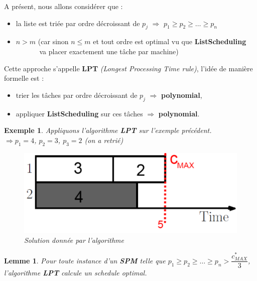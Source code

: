 \documentclass[12pt]{article}
\newcommand{\titre}[1]{\textcolor{title}{#1}}
\newtheorem{exemple}{Exemple}[section]
\newtheorem{lemme}{Lemme}[section]
\begin{document}
\noindent A présent, nous allons considérer que :
\begin{itemize}
\item la liste est triée par ordre décroissant de $p_j$ $\Longrightarrow$ $p_1\geq p_2 \geq \ldots \geq p_n$
\item $n > m$ (car sinon $n\leq m$ et tout ordre est optimal vu que \textbf{ListScheduling} \\\indent $\qquad\quad$ va placer exactement
une tâche par machine) \\
\end{itemize}

Cette approche s'appelle \textbf{LPT} \textit{(Longest Processing Time rule)}, l'idée de manière formelle est :
\begin{itemize}
\item trier les tâches par ordre décroissant de $p_j$ $\Longrightarrow$ \textbf{polynomial},
\item appliquer \textbf{ListScheduling} sur ces tâches $\Longrightarrow$ \textbf{polynomial}.
\end{itemize}

\begin{exemple} Appliquons l'algorithme \textbf{LPT} sur l'exemple précédent.\\
$\Rightarrow p_1 = 4$, $p_2 = 3$, $p_3 = 2$ (on a retrié)
\begin{figure}[h!]
    \begin{center}
    \includegraphics[scale=0.3]{spm6.pdf}
    \caption{Solution donnée par l'algorithme}
    \end{center}
\end{figure}
\end{exemple}

\begin{lemme}
Pour toute instance d'un \textbf{\titre{SPM}} telle que $p_1\geq p_2\geq \ldots \geq p_n > \dfrac{c^*_{MAX}}{3}$, l'algorithme \textbf{LPT}
calcule un schedule optimal.
\end{lemme}
\end{document}
